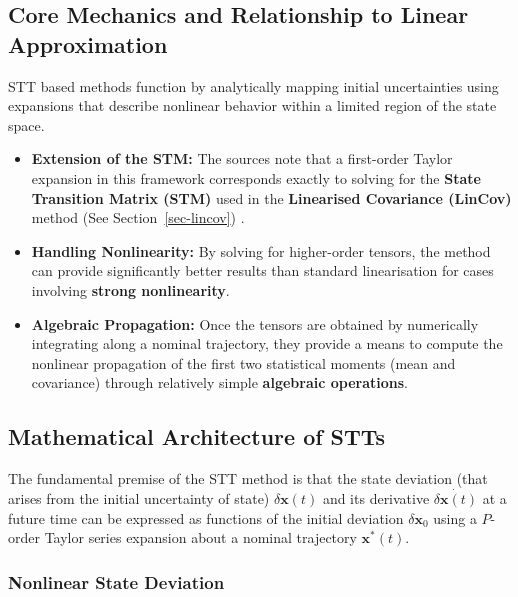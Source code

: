 \documentclass[
  letterpaper,
  DIV=11,
  numbers=noendperiod,
  oneside]{scrartcl}
\begin{document}
\subsection{Core Mechanics and Relationship to Linear
Approximation}\label{core-mechanics-and-relationship-to-linear-approximation}

STT based methods function by analytically mapping initial uncertainties
using expansions that describe nonlinear behavior within a limited
region of the state space.

\begin{itemize}
\item
  \textbf{Extension of the STM:} The sources note that a first-order
  Taylor expansion in this framework corresponds exactly to solving for
  the \textbf{State Transition Matrix (STM)} used in the
  \textbf{Linearised Covariance (LinCov)} method (See
  Section~\ref{sec-lincov}) .
\item
  \textbf{Handling Nonlinearity:} By solving for higher-order tensors,
  the method can provide significantly better results than standard
  linearisation for cases involving \textbf{strong nonlinearity}.
\item
  \textbf{Algebraic Propagation:} Once the tensors are obtained by
  numerically integrating along a nominal trajectory, they provide a
  means to compute the nonlinear propagation of the first two
  statistical moments (mean and covariance) through relatively simple
  \textbf{algebraic operations}.
\end{itemize}

\subsection{Mathematical Architecture of
STTs}\label{mathematical-architecture-of-stts}

The fundamental premise of the STT method is that the state deviation
(that arises from the initial uncertainty of state)
\(\delta \mathbf{x}(t)\) and its derivative
\(\dot{\delta \mathbf{x}(t)}\) at a future time can be expressed as
functions of the initial deviation \(\delta \mathbf{x}_0\) using a
\(P\)-order Taylor series expansion about a nominal trajectory
\(\mathbf{x}^*(t)\).

\subsubsection{Nonlinear State
Deviation}\label{nonlinear-state-deviation}
\end{document}
